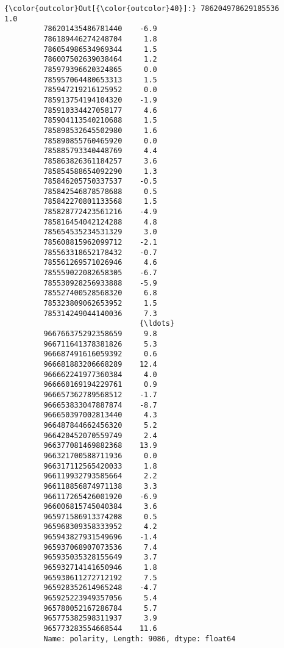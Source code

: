 \documentclass[11pt]{article}
\begin{document}
\begin{Verbatim}[commandchars=\\\{\}]
{\color{outcolor}Out[{\color{outcolor}40}]:} 786204978629185536     1.0
         786201435486781440    -6.9
         786189446274248704     1.8
         786054986534969344     1.5
         786007502639038464     1.2
         785979396620324865     0.0
         785957064480653313     1.5
         785947219216125952     0.0
         785913754194104320    -1.9
         785910334427058177     4.6
         785904113540210688     1.5
         785898532645502980     1.6
         785890855760465920     0.0
         785885793340448769     4.4
         785863826361184257     3.6
         785854588654092290     1.3
         785846205750337537    -0.5
         785842546878578688     0.5
         785842270801133568     1.5
         785828772423561216    -4.9
         785816454042124288     4.8
         785654535234531329     3.0
         785608815962099712    -2.1
         785563318652178432    -0.7
         785561269571026946     4.6
         785559022082658305    -6.7
         785530928256933888    -5.9
         785527400528568320     6.8
         785323809062653952     1.5
         785314249044140036     7.3
                               {\ldots} 
         966766375292358659     9.8
         966711641378381826     5.3
         966687491616059392     0.6
         966681883206668289    12.4
         966662241977360384     4.0
         966660169194229761     0.9
         966657362789568512    -1.7
         966653833047887874    -8.7
         966650397002813440     4.3
         966487844662456320     5.2
         966420452070559749     2.4
         966377081469882368    13.9
         966321700588711936     0.0
         966317112565420033     1.8
         966119932793585664     2.2
         966118856874971138     3.3
         966117265426001920    -6.9
         966006815745040384     3.6
         965971586913374208     0.5
         965968309358333952     4.2
         965943827931549696    -1.4
         965937068907073536     7.4
         965935035328155649     3.7
         965932714141650946     1.8
         965930611272712192     7.5
         965928352614965248    -4.7
         965925223949357056     5.4
         965780052167286784     5.7
         965775382598311937     3.9
         965773283554668544    11.6
         Name: polarity, Length: 9086, dtype: float64
\end{Verbatim}
            
\end{document}
